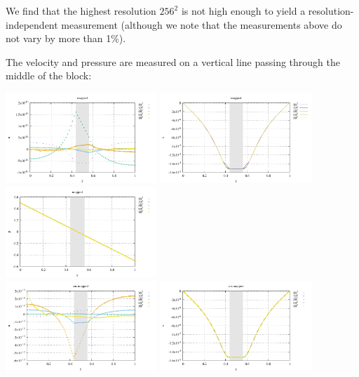 We find that the highest resolution $256^2$ is not high enough to yield a resolution-independent
measurement (although we note that the measurements above do not vary by more than 1\%). 

The velocity and pressure are measured on a vertical line passing through the 
middle of the block:

\begin{center}
\includegraphics[width=5.7cm]{python_codes/fieldstone_76/results/block/profile_m1_u.pdf}
\includegraphics[width=5.7cm]{python_codes/fieldstone_76/results/block/profile_m1_v.pdf}
\includegraphics[width=5.7cm]{python_codes/fieldstone_76/results/block/profile_m1_p.pdf}\\
\includegraphics[width=5.7cm]{python_codes/fieldstone_76/results/block/profile_m2_u.pdf}
\includegraphics[width=5.7cm]{python_codes/fieldstone_76/results/block/profile_m2_v.pdf}

\end{center}
